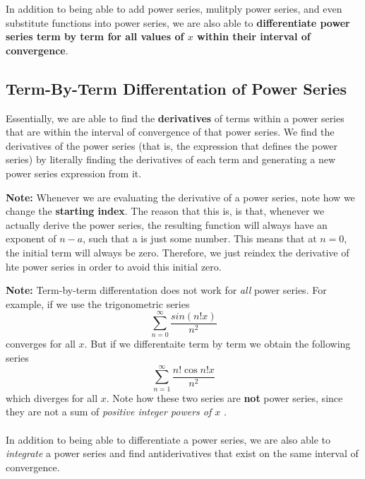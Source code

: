 In addition to being able to add power series, mulitply
power series, and even substitute functions into power series,
we are also able to \textbf{differentiate power series term by term
for all values of $ x $ within their interval of convergence}.

\subsection{Term-By-Term Differentation of Power Series}
\begin{center}
\end{center}
Essentially, we are able to find the \textbf{derivatives} of terms within
a power series that are within the interval of convergence of that power series. We
find the derivatives of the power series (that is, the expression that defines
the power series) by literally finding the derivatives of each term and generating
a new power series expression from it.
\par \textbf{Note:} Whenever we are evaluating the derivative of a
power series, note how we change the \textbf{starting index}.
The reason that this is, is that, whenever we actually derive the power series,
the resulting function will always have an exponent of $ n - a $, such that
a is just some number. This means that at $ n =0 $, the initial term will
always be zero. Therefore, we just reindex the derivative of hte power series
in order to avoid this initial zero.
\par \textbf{Note:} Term-by-term differentation does not work for \textit{all}
power series. For example, if we use the trigonometric series
\[ \sum_{n=0}^{\infty} \frac{sin(n!x)}{n^{2}}  \]
converges for all $ x $. But if we differentaite term by term
we obtain the following series
\[ \sum_{n=1}^{\infty} \frac{n!\cos{n!x}}{n^{2}} \]
which diverges for all $ x $. Note how these two series are \textbf{not}
power series, since they are not a sum of \textit{positive integer powers of $x$ }.
\\ \\
In addition to being able to differentiate a power series, we are also able to
\textit{integrate} a power series and find antiderivatives that exist on
the same interval of convergence.

